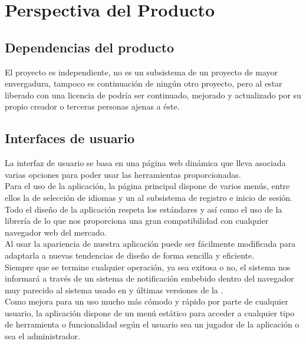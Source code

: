 \section{Perspectiva del Producto}
\subsection{Dependencias del producto}
El proyecto es independiente, no es un subsistema de un proyecto de
mayor envergadura, tampoco es continuación de ningún otro proyecto,
pero al estar liberado con una licencia de 
podría ser continuado, mejorado y actualizado por su propio creador o
terceras personas ajenas a éste.

\subsection{Interfaces de usuario}
La interfaz de usuario se basa en una página web dinámica que lleva
asociada varias opciones para poder usar las herramientas
proporcionadas.\\

Para el uso de la aplicación, la página principal dispone de varios
menús, entre ellos la de selección de idiomas y un  al
subsistema de registro e inicio de sesión.\\

Todo el diseño de la aplicación respeta los estándares  y  así como el uso de la librería de
 lo que nos proporciona una gran
compatibilidad con cualquier navegador web del mercado.\\

Al usar  la apariencia de nuestra
aplicación puede ser fácilmente modificada para adaptarla a nuevas
tendencias de diseño de forma sencilla y eficiente.\\

Siempre que se termine cualquier operación, ya sea exitosa o no, el
sistema nos informará a través de un sistema de notificación embebido
dentro del navegador muy parecido al sistema usado en  y últimas versiones de la .\\

Como mejora para un uso mucho más cómodo y rápido por parte de
cualquier usuario, la aplicación dispone de un menú estático para
acceder a cualquier tipo de herramienta o funcionalidad según el
usuario sea un jugador de la aplicación o sea el administrador.

